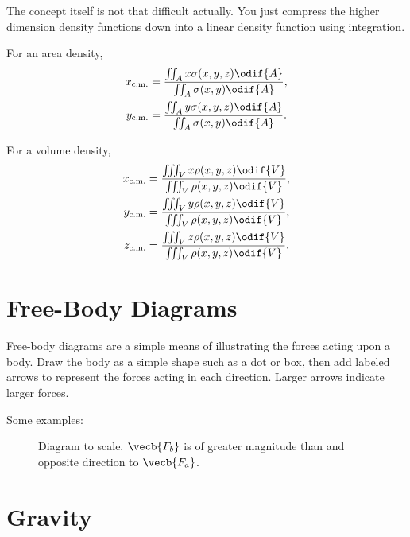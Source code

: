 The concept itself is not that difficult actually.
You just compress the higher dimension density functions
down into a linear density function using integration.

For an area density,
\begin{equation}
    \begin{aligned}
        x_\mathrm{c.m.} &=
        \frac{\iint_A x \sigma(x, y, z) \odif{A}}
        {\iint_A \sigma(x, y) \odif{A}}, \\
        y_\mathrm{c.m.} &=
        \frac{\iint_A y \sigma(x, y, z) \odif{A}}
        {\iint_A \sigma(x, y) \odif{A}}.
    \end{aligned}
\end{equation}

For a volume density,
\begin{equation}
    \begin{aligned}
        x_\mathrm{c.m.} &=
        \frac{\iiint_V x \rho(x, y, z) \odif{V}}
        {\iiint_V \rho(x, y, z) \odif{V}}, \\
        y_\mathrm{c.m.} &=
        \frac{\iiint_V y \rho(x, y, z) \odif{V}}
        {\iiint_V \rho(x, y, z) \odif{V}}, \\
        z_\mathrm{c.m.} &=
        \frac{\iiint_V z \rho(x, y, z) \odif{V}}
        {\iiint_V \rho(x, y, z) \odif{V}}.
    \end{aligned}
\end{equation}

\section{Free-Body Diagrams} \label{sec:free-body-diagrams}

Free-body diagrams are a simple means of illustrating the forces
acting upon a body.
Draw the body as a simple shape such as a dot or box,
then add labeled arrows to represent the forces acting in each direction.
Larger arrows indicate larger forces.

Some examples:
\begin{figure}[ht]
    \centering
    
    \caption{
        Diagram to scale.
        \(\vecb{F_b}\) is of greater magnitude than and opposite
        direction to \(\vecb{F_a}\).
    }
\end{figure}

\section{Gravity}

